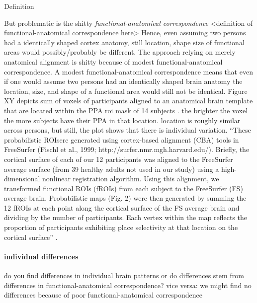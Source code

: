{Definition

But problematic is the shitty \textit{functional-anatomical correspondence}
<definition of functional-anatomical correspondence here>
Hence, even assuming two persons had a identically shaped cortex anatomy, still
location, shape size of functional areas would possibly/probably be different.
The approach relying on merely anatomical alignment is shitty because of modest
functional-anatomical correspondence.
A modest functional-anatomical correspondence means that even if one would
assume two persons had an identically shaped brain anatomy the location, size,
and shape of a functional area would still not be identical.
%
Figure XY depicts sum of voxels of participants aligned to an anatomical brain
template that are located within the \ac{PPA} \ac{roi} mask of 14 subjects
\citep{sengupta2016extension}.
%
the brighter the voxel the more subjects have their PPA in that location.
%
location is roughly similar across persons, but still, the plot shows that there
is individual variation.
%
``These probabilistic ROIsere generated using cortex-based alignment (CBA) tools
in FreeSurfer (Fischl et al., 1999; http://surfer.nmr.mgh.harvard.edu/). Brieﬂy,
the cortical surface of each of our 12 participants was aligned to the
FreeSurfer average surface (from 39 healthy adults not used in our study) using
a high-dimensional nonlinear registration algorithm. Using this alignment, we
transformed functional ROIs (fROIs) from each subject to the FreeSurfer (FS)
average brain. Probabilistic maps (Fig. 2) were then generated by summing the 12
fROIs at each point along the cortical surface of the FS average brain and
dividing by the number of participants. Each vertex within the map reﬂects the
proportion of participants exhibiting place selectivity at that location on the
cortical surface'' \citep{weiner2018defining}.


\paragraph{individual differences}

%
do you find differences in individual brain patterns or do differences stem from
differences in functional-anatomical correspondence?
%
vice versa: we might find no differences because of poor functional-anatomical
correspondence


}
